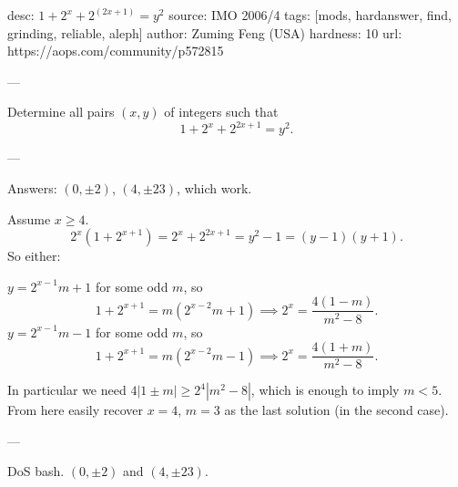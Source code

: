 desc:  $1 + 2^x + 2^(2x+1) = y^2$
source:  IMO 2006/4
tags:  [mods, hardanswer, find, grinding, reliable, aleph]
author: Zuming Feng (USA)
hardness: 10
url: https://aops.com/community/p572815

---

Determine all pairs $(x,y)$ of integers such that
\[ 1 + 2^x + 2^{2x+1} = y^2. \]

---

Answers: $(0, \pm 2)$, $(4, \pm 23)$, which work.

Assume $x \ge 4$.
\[ 2^x \left( 1 + 2^{x+1} \right)
  = 2^x + 2^{2x+1} = y^2 - 1 = (y-1)(y+1). \]
So either:
\begin{itemize}
  \ii $y = 2^{x-1} m + 1$ for some odd $m$, so
  \[ 1 + 2^{x+1} = m\left( 2^{x-2}m+1 \right)
    \implies 2^x = \frac{4(1-m)}{m^2-8}. \]
  \ii $y = 2^{x-1} m - 1$ for some odd $m$, so
  \[ 1 + 2^{x+1} = m\left( 2^{x-2}m-1 \right)
    \implies 2^x = \frac{4(1+m)}{m^2-8}. \]
\end{itemize}
In particular we need $4|1 \pm m| \ge 2^4 |m^2-8|$,
which is enough to imply $m < 5$.
From here easily recover $x = 4$, $m = 3$ as the last solution
(in the second case).


---

DoS bash. $(0, \pm 2)$ and $(4, \pm 23)$.
